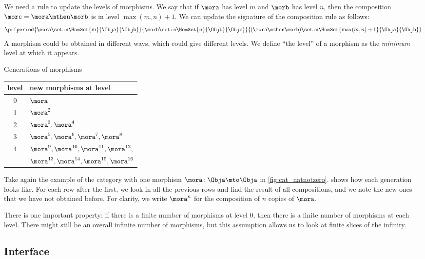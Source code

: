 We need a rule to update the levels of morphisms.
We say that if $\mora$ has level $m$ and $\morb$ has level $n$, then the composition $\morc = \mora\mthen\morb$ is in level $\max(m,n) + 1$.
We can update the signature of the composition rule as follows:
\begin{equation}
    \prfperiod{
        \mora \setin \HomSet{m}{\Obja}{\Objb}
    }{
        \morb \setin \HomSet{n}{\Objb}{\Objc}
    }{
        (\mora\mthen\morb) \setin \HomSet{\max(m,n)+1}{\Obja}{\Objb}
    }
\end{equation}
A morphism could be obtained in different ways, which could give different levels.
We define ``the level'' of a morphism as the \emph{minimum} level at which it appears.

\begin{margintable}
    \caption{Generations of morphisms }
    \begin{tabular}{cl}
        level & new morphisms at level \\
        \hline
        0     & $\mora$ \\
        1     & $\mora^2$ \\
        2     & $\mora^3, \mora^4$ \\
        3     & $\mora^5, \mora^6, \mora^7, \mora^8$ \\
        4     & $\mora^9, \mora^{10}, \mora^{11}, \mora^{12}, $ \\
              & $\mora^{13}, \mora^{14}, \mora^{15}, \mora^{16}$
    \end{tabular}
    \label{tab:generations}

\end{margintable}

Take again the example of the category with one morphism $\mora\colon\Obja \mto \Obja$ in \cref{fig:cat_natnotzero}.
 shows how each generation looks like.
For each row after the first,
we look in all the previous rows and find the result of all compositions, and we note the new ones that we have not obtained before.
For clarity, we write $\mora^n$ for the composition of $n$ copies of $\mora$.

There is one important property: if there is a finite number of morphisms at level 0, then there is a finite number of morphisms at each level.
There might still be an overall infinite number of morphisms, but this assumption allows us to look at finite slices of the infinity.

\vfill\pagebreak

\subsection{Interface}

